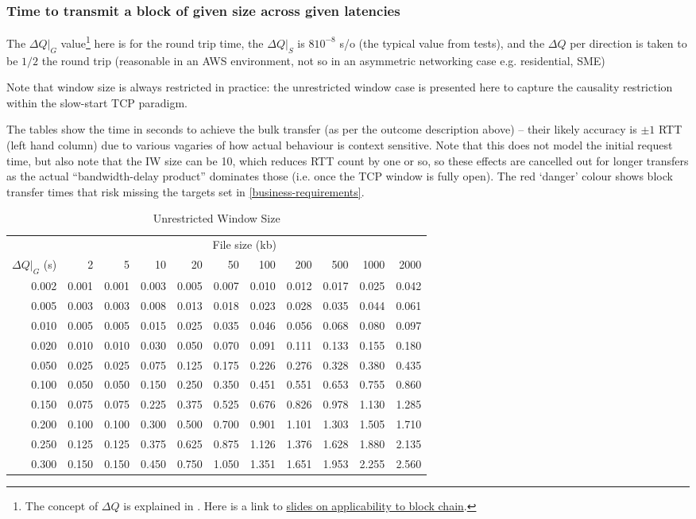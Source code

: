 \documentclass[11pt,a4paper]{article}
\begin{document}
\subsubsection{Time to transmit a block of given size across given latencies}
\label{time-to-transmit-a-block-of-given-size-across-given-latencies}

The $\Delta{}Q|_G$ value\footnote{The concept of $\Delta{}Q$ is
  explained in \cite{Comp20}. Here is a link to
  \href{https://www.slideshare.net/pnsol-slides/q-and-blockchain-83943683}{{slides
  on applicability to block chain}}.} here is for the round trip time,
the $\Delta{}Q|_S$ is $8\text{}10^{-8}$ s/o (the
typical value from tests), and the $\Delta{}Q$ per direction is taken to
be $1/2$ the round trip (reasonable in an AWS environment, not so in an
asymmetric networking case e.g. residential, SME)

Note that window size is always restricted in practice: the unrestricted
window case is presented here to capture the causality restriction
within the slow-start TCP paradigm.

The tables show the time in seconds to achieve the bulk transfer (as per
the outcome description above) -- their likely accuracy is $\pm 1$ RTT (left
hand column) due to various vagaries of how actual behaviour is context
sensitive. Note that this does not model the initial request time, but
also note that the IW size can be 10, which reduces RTT count by one or
so, so these effects are cancelled out for longer transfers as the
actual ``bandwidth-delay product'' dominates those (i.e. once the TCP
window is fully open). The red `danger' colour shows block transfer
times that risk missing the targets set in \cref{business-requirements}.

\begin{table}
\begin{longtable}[]{r|rrrrrrrrrr}
\toprule
  \caption{Unrestricted Window Size}\tabularnewline
\midrule
                     & \multicolumn{10}{c}{File size (kb)}\tabularnewline
  $\Delta{}Q|_G$ (s) & 2 & 5 & 10 & 20 & 50 & 100 & 200 & 500 & 1000 & 2000\tabularnewline
\midrule
\endhead
0.002 & 0.001 & 0.001 & 0.003 & 0.005 & 0.007 & 0.010 & 0.012 & 0.017 &
0.025 & 0.042\tabularnewline
0.005 & 0.003 & 0.003 & 0.008 & 0.013 & 0.018 & 0.023 & 0.028 & 0.035 &
0.044 & 0.061\tabularnewline
0.010 & 0.005 & 0.005 & 0.015 & 0.025 & 0.035 & 0.046 & 0.056 & 0.068 &
0.080 & 0.097\tabularnewline
0.020 & 0.010 & 0.010 & 0.030 & 0.050 & 0.070 & 0.091 & 0.111 & 0.133 &
0.155 & 0.180\tabularnewline
0.050 & 0.025 & 0.025 & 0.075 & 0.125 & 0.175 & 0.226 & 0.276 & 0.328 &
0.380 & 0.435\tabularnewline
0.100 & 0.050 & 0.050 & 0.150 & 0.250 & 0.350 & 0.451 & 0.551 & 0.653 &
0.755 & 0.860\tabularnewline
0.150 & 0.075 & 0.075 & 0.225 & 0.375 & 0.525 & 0.676 & 0.826 & 0.978 &
1.130 & 1.285\tabularnewline
0.200 & 0.100 & 0.100 & 0.300 & 0.500 & 0.700 & 0.901 & 1.101 & 1.303 &
1.505 & 1.710\tabularnewline
0.250 & 0.125 & 0.125 & 0.375 & 0.625 & 0.875 & 1.126 & 1.376 & 1.628 &
1.880 & 2.135\tabularnewline
0.300 & 0.150 & 0.150 & 0.450 & 0.750 & 1.050 & 1.351 & 1.651 & 1.953 &
2.255 & 2.560\tabularnewline
\bottomrule
\end{longtable}
\end{table}
\end{document}
